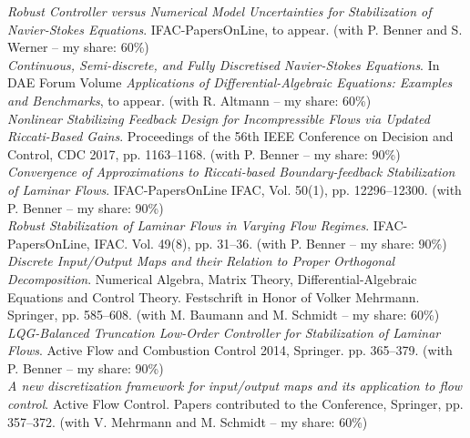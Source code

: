  \emph{Robust Controller versus Numerical Model Uncertainties for Stabilization of Navier-Stokes Equations}. IFAC-PapersOnLine, to appear. (with P. Benner and S. Werner -- my share: 60\%) \\

 \emph{Continuous, Semi-discrete, and Fully Discretised Navier-Stokes Equations}. In DAE Forum Volume \emph{Applications of Differential-Algebraic Equations: Examples and Benchmarks}, to appear. (with R. Altmann -- my share: 60\%) \\

 \emph{Nonlinear Stabilizing Feedback Design for Incompressible Flows via Updated Riccati-Based Gains}. Proceedings of the 56th IEEE Conference on Decision and Control, CDC 2017, pp. 1163--1168. (with P. Benner -- my share: 90\%) \\ 

 {\emph{Convergence of Approximations to Riccati-based Boundary-feedback Stabilization of Laminar Flows}. IFAC-PapersOnLine IFAC, Vol. 50(1), pp. 12296--12300.} (with P. Benner -- my share: 90\%)\\

 \emph{Robust Stabilization of Laminar Flows in Varying Flow Regimes}. IFAC-PapersOnLine, IFAC. Vol. 49(8), pp. 31--36. (with P. Benner -- my share: 90\%)\\

 \emph{Discrete Input/Output Maps and their Relation to Proper Orthogonal Decomposition}. Numerical Algebra, Matrix Theory, Differential-Algebraic Equations and Control Theory. Festschrift in Honor of Volker Mehrmann. Springer, pp. 585--608. (with M. Baumann and M. Schmidt -- my share: 60\%) \\

 {{\emph{LQG-Balanced Truncation Low-Order Controller for Stabilization of Laminar Flows}}. Active Flow and Combustion Control 2014, Springer. pp. 365--379.} (with P. Benner -- my share: 90\%) \\

 \emph{A new discretization framework for input/output maps and its application to flow control}. Active Flow Control. Papers contributed to the Conference, Springer, pp. 357--372. (with V. Mehrmann and M. Schmidt -- my share: 60\%) 


